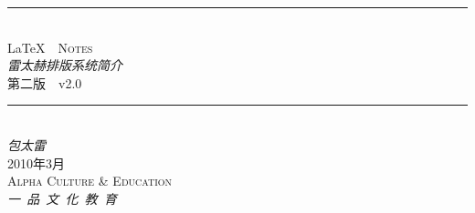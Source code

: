 \begin{titlepage}
\begin{center}
\hrule\ \\[5pt]
\Huge \LaTeX\ \ \textsc{Notes}\\[8pt]
\Large \textit{雷太赫排版系统简介}\\[8pt]
\normalsize 第二版\ \ v2.0\\[20pt]
\hrule\ \\[100pt]

\huge \textit{包太雷}\\[8pt]
\Large 2010年3月\\[200pt]

\textsc{Alpha Culture \& Education}\\[8pt]
\huge \textit{一\ 品\ 文\ 化\ 教\ 育}
\normalsize
\end{center}
\end{titlepage}
